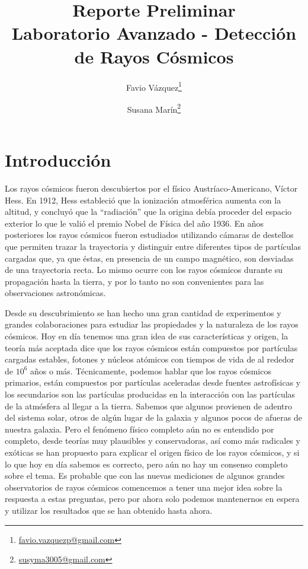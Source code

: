 \documentclass[a4paper,10pt]{article}
\title{{\huge Reporte Preliminar} \\
\vspace{.2cm}
\large Laboratorio Avanzado - Detección de Rayos Cósmicos}
\author[1]{Favio Vázquez\footnote{\url{favio.vazquezp@gmail.com}}}
\author[2]{Susana Marín\footnote{\url{susyma3005@gmail.com}}}
\affil[1]{Instituto de Ciencias Nucleares,
Universidad Nacional Autónoma de México}
\affil[2]{Instituto de Química,
Universidad Nacional Autónoma de México}
\date{}
\numberwithin{equation}{section}
\begin{document}
\maketitle

\section*{Introducción}

Los rayos cósmicos fueron descubiertos por el físico Austríaco-Americano, Víctor
Hess. En 1912, Hess estableció que la ionización atmosférica aumenta con la
altitud, y concluyó que la “radiación” que la origina debía proceder del espacio
exterior lo que le valió el premio Nobel de Física del año 1936. En años posteriores
los rayos cósmicos fueron estudiados utilizando cámaras de destellos que permiten 
trazar la trayectoria y distinguir entre diferentes tipos de partículas cargadas que,
ya que éstas, en presencia de un campo magnético, son desviadas de una trayectoria
recta. Lo mismo ocurre con los rayos cósmicos durante su propagación hasta la 
tierra, y por lo tanto no son convenientes para las observaciones astronómicas. 

\vspace{.3cm}

Desde su descubrimiento se han hecho una gran cantidad de experimentos y grandes 
colaboraciones para estudiar las propiedades y la naturaleza de los rayos cósmicos. 
Hoy en día tenemos una gran idea de sus características y origen, la teoría 
más aceptada dice que los rayos cósmicos están compuestos por partículas cargadas 
estables, fotones y núcleos atómicos con tiempos de vida de al rededor de 
$10^6$ años o más. Técnicamente, podemos hablar que los rayos cósmicos primarios, 
están compuestos por partículas aceleradas desde fuentes astrofísicas y los secundarios 
son las partículas producidas en la interacción con las partículas de la atmósfera 
al llegar a la tierra. Sabemos que algunos provienen de adentro del sistema solar, 
otros de algún lugar de la galaxia y algunos pocos de afueras de nuestra galaxia. Pero 
el fenómeno físico completo aún no es entendido por completo, desde teorías muy plausibles 
y conservadoras, así como más radicales y exóticas se han propuesto para explicar 
el origen físico de los rayos cósmicos, y si lo que hoy en día sabemos es correcto, pero 
aún no hay un consenso completo sobre el tema. Es probable que con las nuevas mediciones 
de algunos grandes observatorios de rayos cósmicos comencemos a tener una mejor idea 
sobre la respuesta a estas preguntas, pero por ahora solo podemos mantenernos en espera 
y utilizar los resultados que se han obtenido hasta ahora.
\end{document}
